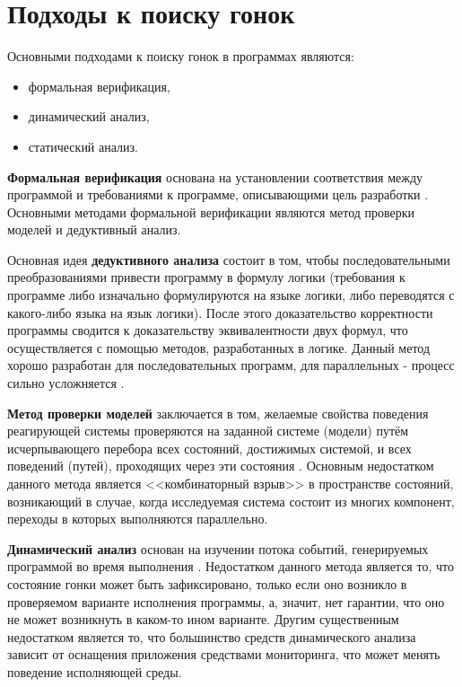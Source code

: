 \chapter{Подходы к поиску гонок}
\label{cha:methods}

Основными подходами к поиску гонок в программах являются:
\begin{itemize}
\item формальная верификация,
\item динамический анализ,
\item статический анализ.
\end{itemize}

\textbf{Формальная верификация} основана на установлении соответствия между программой и требованиями к программе, описывающими цель разработки \cite{kropacheva-formal-verification}. Основными методами формальной верификации являются метод проверки моделей и дедуктивный анализ.

Основная идея \textbf{дедуктивного анализа} состоит в том, чтобы последовательными преобразованиями привести программу в формулу логики (требования к программе либо изначально формулируются на языке логики, либо переводятся с какого-либо языка на язык логики). После этого доказательство корректности программы сводится к доказательству эквивалентности двух формул, что осуществляется с помощью методов, разработанных в логике. Данный метод хорошо разработан для последовательных программ, для параллельных - процесс сильно усложняется \cite{kropacheva-formal-verification}.

\textbf{Метод проверки моделей} заключается в том, желаемые свойства поведения реагирующей системы проверяются на заданной системе (модели) путём исчерпывающего перебора всех состояний, достижимых системой, и всех поведений (путей), проходящих через эти состояния \cite{klark-model-checking}. Основным недостатком данного метода является <<комбинаторный взрыв>> в пространстве состояний, возникающий в случае, когда исследуемая система состоит из многих компонент, переходы в которых выполняются параллельно.

\textbf{Динамический анализ} основан на изучении потока событий, генерируемых программой во время выполнения \cite{kovega-dynamic-analysis}. Недостатком данного метода является то, что состояние гонки может быть зафиксировано, только если оно возникло в проверяемом варианте исполнения программы, а, значит, нет гарантии, что оно не может возникнуть в каком-то ином варианте. Другим существенным недостатком является то, что большинство средств динамического анализа зависит от оснащения приложения средствами мониторинга, что может менять поведение исполняющей среды.

